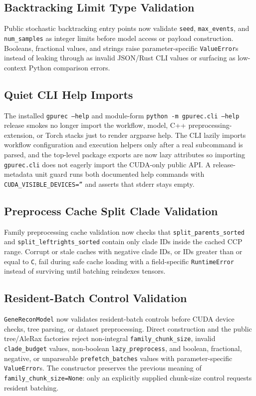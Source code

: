 \documentclass[11pt]{article}
\begin{document}
\subsection{Backtracking Limit Type Validation}

Public stochastic backtracking entry points now validate \texttt{seed},
\texttt{max\_events}, and \texttt{num\_samples} as integer limits before model
access or payload construction.  Booleans, fractional values, and strings raise
parameter-specific \texttt{ValueError}s instead of leaking through as invalid
JSON/Rust CLI values or surfacing as low-context Python comparison errors.

\subsection{Quiet CLI Help Imports}

The installed \texttt{gpurec --help} and module-form
\texttt{python -m gpurec.cli --help} release smokes no longer import the
workflow, model, C++ preprocessing-extension, or Torch stacks just to render
argparse help.  The CLI lazily imports workflow configuration and execution
helpers only after a real subcommand is parsed, and the top-level package
exports are now lazy attributes so importing \texttt{gpurec.cli} does not
eagerly import the CUDA-only public API.  A release-metadata unit guard runs
both documented help commands with \texttt{CUDA\_VISIBLE\_DEVICES=''} and
asserts that stderr stays empty.

\subsection{Preprocess Cache Split Clade Validation}

Family preprocessing cache validation now checks that
\texttt{split\_parents\_sorted} and \texttt{split\_leftrights\_sorted} contain
only clade IDs inside the cached CCP range.  Corrupt or stale caches with
negative clade IDs, or IDs greater than or equal to \texttt{C}, fail during
safe cache loading with a field-specific \texttt{RuntimeError} instead of
surviving until batching reindexes tensors.

\subsection{Resident-Batch Control Validation}

\texttt{GeneReconModel} now validates resident-batch controls before CUDA
device checks, tree parsing, or dataset preprocessing.  Direct construction and
the public tree/AleRax factories reject non-integral
\texttt{family\_chunk\_size}, invalid \texttt{clade\_budget} values,
non-boolean \texttt{lazy\_preprocess}, and boolean, fractional, negative, or
unparseable \texttt{prefetch\_batches} values with parameter-specific
\texttt{ValueError}s.  The constructor preserves the previous meaning of
\texttt{family\_chunk\_size=None}: only an explicitly supplied chunk-size
control requests resident batching.
\end{document}
